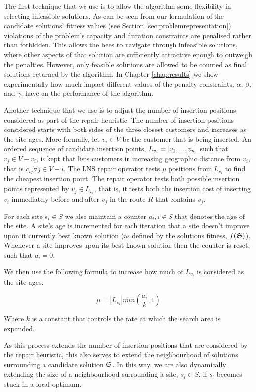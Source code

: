 The first technique that we use is to allow the algorithm some flexibility in selecting infeasible solutions. As can be seen from our formulation of the candidate solutions' fitness values (see Section \ref{sec:problemrepresentation}) violations of the problem's capacity and duration constraints are penalised rather than forbidden. This allows the bees to navigate through infeasible solutions, where other aspects of that solution are sufficiently attractive enough to outweigh the penalties. However, only feasible solutions are allowed to be counted as final solutions returned by the algorithm. In Chapter \ref{chap:results} we show experimentally how much impact different values of the penalty constraints, $\alpha$, $\beta$, and $\gamma$, have on the performance of the algorithm.

Another technique that we use is to adjust the number of insertion positions considered as part of the repair heuristic. The number of insertion positions considered starts with both sides of the three closest customers and increases as the site ages. More formally, let $v_i \in V$ be the customer that is being inserted. An ordered sequence of candidate insertion points, $L_{v_i} = [v_1,...,v_n]$ such that $v_j \in V - v_i$, is kept that lists customers in increasing geographic distance from $v_i$, that is $c_{ij} \forall j \in V - i$. The LNS repair operator tests $\mu$ positions from $L_{v_i}$ to find the cheapest insertion point. The repair operator tests both possible insertion points represented by $v_j \in L_{v_i}$, that is, it tests both the insertion cost of inserting $v_i$ immediately before and after $v_j$ in the route $R$ that contains $v_j$. 

For each site $s_i \in S$ we also maintain a counter $a_i, i \in S$ that denotes the age of the site. A site's age is incremented for each iteration that a site doesn't improve upon it currently best known solution (as defined by the solutions fitness, $f(\mathfrak{S})$). Whenever a site improves upon its best known solution then the counter is reset, such that $a_i = 0$.


We then use the following formula to increase how much of $L_{v_i}$ is considered as the site ages.

\[
   \mu = \left|L_{v_i}\right| min\left(\frac{a_i}{k}, 1\right)
\]

Where $k$ is a constant that controls the rate at which the search area is expanded. 

As this process extends the number of insertion positions that are considered by the repair heuristic, this also serves to extend the neighbourhood of solutions surrounding a candidate solution $\mathfrak{S}$. In this way, we are also dynamically extending the size of a neighbourhood surrounding a site, $s_i \in S$, if $s_i$ becomes stuck in a local optimum.


